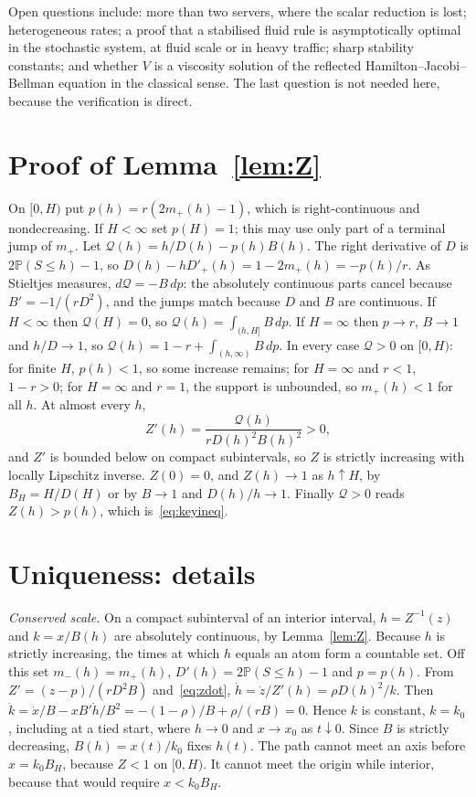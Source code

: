 \documentclass[11pt]{article}
\numberwithin{equation}{section}
\theoremstyle{definition}
\theoremstyle{remark}
\newcommand{\Prob}{\mathbb{P}}
\begin{document}
Open questions include: more than two servers, where the scalar reduction is lost; heterogeneous rates; a proof that a stabilised fluid rule is asymptotically optimal in the stochastic system, at fluid scale or in heavy traffic; sharp stability constants; and whether $V$ is a viscosity solution of the reflected Hamilton--Jacobi--Bellman equation in the classical sense. The last question is not needed here, because the verification is direct.

\appendix

\section{Proof of Lemma~\ref{lem:Z}}\label{app:Z}

On $[0,H)$ put $p(h)=r(2m_+(h)-1)$, which is right-continuous and nondecreasing. If $H<\infty$ set $p(H)=1$; this may use only part of a terminal jump of $m_+$. Let $\mathcal Q(h)=h/D(h)-p(h)B(h)$. The right derivative of $D$ is $2\Prob(S\le h)-1$, so $D(h)-hD'_+(h)=1-2m_+(h)=-p(h)/r$. As Stieltjes measures, $d\mathcal Q=-B\,dp$: the absolutely continuous parts cancel because $B'=-1/(rD^2)$, and the jumps match because $D$ and $B$ are continuous. If $H<\infty$ then $\mathcal Q(H)=0$, so $\mathcal Q(h)=\int_{(h,H]}B\,dp$. If $H=\infty$ then $p\to r$, $B\to1$ and $h/D\to1$, so $\mathcal Q(h)=1-r+\int_{(h,\infty)}B\,dp$. In every case $\mathcal Q>0$ on $[0,H)$: for finite $H$, $p(h)<1$, so some increase remains; for $H=\infty$ and $r<1$, $1-r>0$; for $H=\infty$ and $r=1$, the support is unbounded, so $m_+(h)<1$ for all $h$. At almost every $h$,
\[
Z'(h)=\frac{\mathcal Q(h)}{rD(h)^2B(h)^2}>0,
\]
and $Z'$ is bounded below on compact subintervals, so $Z$ is strictly increasing with locally Lipschitz inverse. $Z(0)=0$, and $Z(h)\to1$ as $h\uparrow H$, by $B_H=H/D(H)$ or by $B\to1$ and $D(h)/h\to1$. Finally $\mathcal Q>0$ reads $Z(h)>p(h)$, which is~\eqref{eq:keyineq}.

\section{Uniqueness: details}\label{app:unique}

\emph{Conserved scale.} On a compact subinterval of an interior interval, $h=Z^{-1}(z)$ and $k=x/B(h)$ are absolutely continuous, by Lemma~\ref{lem:Z}. Because $h$ is strictly increasing, the times at which $h$ equals an atom form a countable set. Off this set $m_-(h)=m_+(h)$, $D'(h)=2\Prob(S\le h)-1$ and $p=p(h)$. From $Z'=(z-p)/(rD^2B)$ and~\eqref{eq:zdot}, $\dot h=\dot z/Z'(h)=\rho D(h)^2/k$. Then $\dot k=\dot x/B-xB'\dot h/B^2=-(1-\rho)/B+\rho/(rB)=0$. Hence $k$ is constant, $k=k_0$, including at a tied start, where $h\to0$ and $x\to x_0$ as $t\downarrow0$. Since $B$ is strictly decreasing, $B(h)=x(t)/k_0$ fixes $h(t)$. The path cannot meet an axis before $x=k_0B_H$, because $Z<1$ on $[0,H)$. It cannot meet the origin while interior, because that would require $x<k_0B_H$.
\end{document}
